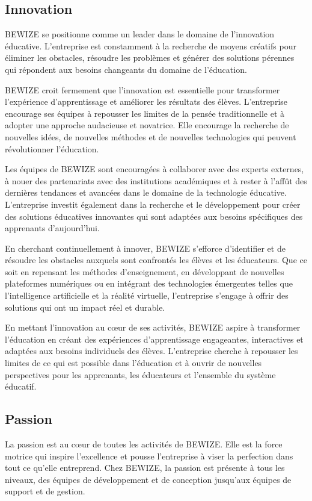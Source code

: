 \subsection{Innovation} 
BEWIZE se positionne comme un leader dans le domaine de l'innovation éducative. L'entreprise est constamment à la recherche de moyens créatifs pour éliminer les obstacles, résoudre les problèmes et générer des solutions pérennes qui répondent aux besoins changeants du domaine de l'éducation.

BEWIZE croit fermement que l'innovation est essentielle pour transformer l'expérience d'apprentissage et améliorer les résultats des élèves. L'entreprise encourage ses équipes à repousser les limites de la pensée traditionnelle et à adopter une approche audacieuse et novatrice. Elle encourage la recherche de nouvelles idées, de nouvelles méthodes et de nouvelles technologies qui peuvent révolutionner l'éducation.

Les équipes de BEWIZE sont encouragées à collaborer avec des experts externes, à nouer des partenariats avec des institutions académiques et à rester à l'affût des dernières tendances et avancées dans le domaine de la technologie éducative. L'entreprise investit également dans la recherche et le développement pour créer des solutions éducatives innovantes qui sont adaptées aux besoins spécifiques des apprenants d'aujourd'hui.

En cherchant continuellement à innover, BEWIZE s'efforce d'identifier et de résoudre les obstacles auxquels sont confrontés les élèves et les éducateurs. Que ce soit en repensant les méthodes d'enseignement, en développant de nouvelles plateformes numériques ou en intégrant des technologies émergentes telles que l'intelligence artificielle et la réalité virtuelle, l'entreprise s'engage à offrir des solutions qui ont un impact réel et durable.

En mettant l'innovation au cœur de ses activités, BEWIZE aspire à transformer l'éducation en créant des expériences d'apprentissage engageantes, interactives et adaptées aux besoins individuels des élèves. L'entreprise cherche à repousser les limites de ce qui est possible dans l'éducation et à ouvrir de nouvelles perspectives pour les apprenants, les éducateurs et l'ensemble du système éducatif.

\subsection{Passion} 
La passion est au cœur de toutes les activités de BEWIZE. Elle est la force motrice qui inspire l'excellence et pousse l'entreprise à viser la perfection dans tout ce qu'elle entreprend. Chez BEWIZE, la passion est présente à tous les niveaux, des équipes de développement et de conception jusqu'aux équipes de support et de gestion.


